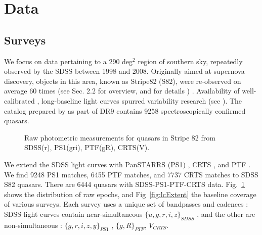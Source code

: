 \documentclass[twocolumn]{aastex62}
\begin{document}
\section{Data}\label{sec:data}
\subsection{Surveys}
We focus on data pertaining to a 290 deg$^{2}$ region of southern sky, repeatedly observed by the SDSS between 1998 and 2008. Originally aimed at supernova discovery, objects in this area, known as Stripe82 (S82), were  re-observed on average 60 times (see \citealt{macleod2012} Sec. 2.2 for overview, and \citealt{annis2014} for details ) . Availability of well-calibrated \citep{ivezic2007}, long-baseline light curves spurred variability research (see \citealt{sesar2007}). The catalog prepared by \citep{schneider2008} as part of DR9  contains 9258 spectroscopically confirmed quasars.  

\begin{figure}%
\caption{Raw photometric measurements for quasars in Stripe 82 from SDSS(r),  PS1(gri),  PTF(gR), CRTS(V).}
\label{fig:rawBaselines}
\end{figure} 

\begin{figure*}
\caption{An illustration of survey baseline, sky area covered, and depth. The width of each rectangle corresponds to the extent of light curves available (or simulated) for Stripe 82 quasars for each survey. For SDSS this means DR7; for CRTS DR2, PS1 DR2, PTF DR2, ZTF year 2018, and LSST the full 10-year survey. The lower edge of each rectangle corresponds to the $5\sigma$ limiting magnitude (SDSS r, PS1 r, PTF R, ZTF r, LSST r, CRTS V). The vertical extent corresponds to the total survey area (for SDSS, up to and including DR15).  Note how PS1 and PTF extend the baseline of SDSS by approximately $50\%$, and how inclusion of LSST triples the SDSS baseline. For reference, the area covered by LSST is $25 000$ sq.deg., which corresponds to  $60\%$ of the sky. The whole sky has an area of $4\pi$ steradians (41253 sq.deg.).}
\label{fig:lcExtent}
\end{figure*} 


We extend the SDSS  light curves with PanSTARRS (PS1) \citep{chambers2011,flewelling2018}, CRTS \citep{drake2009}, and PTF \citep{rau2009}. We find 9248 PS1 matches, 6455 PTF matches, and 7737 CRTS matches to SDSS S82 quasars. There are  6444 quasars with SDSS-PS1-PTF-CRTS data.  Fig.~\ref{fig:rawBaselines}  shows the distribution of raw epochs, and Fig~\ref{fig:lcExtent} the  baseline coverage of various surveys.    Each survey uses a unique set of bandpasses and cadences : SDSS light curves contain near-simultaneous $\{u,g,r,i,z\}_{SDSS}$ , and the other are  non-simultaneous : $\{g,r,i,z,y\}_{PS1}$ ,  $\{g,R\}_{PTF}$, $V_{CRTS}$.  
\end{document}
